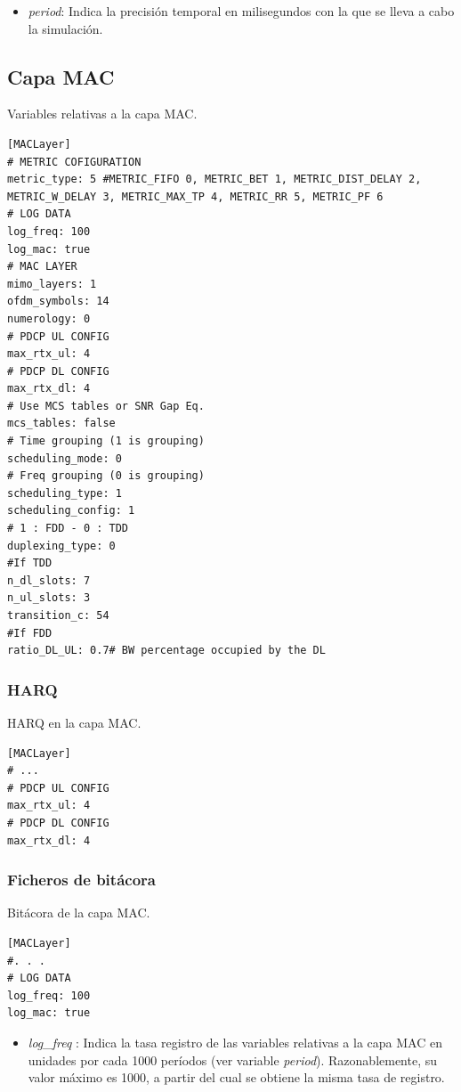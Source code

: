 \documentclass[12pt]{report} %
\begin{document}
\begin{itemize}
\item \textit{period}: Indica la precisión temporal en milisegundos con la que se lleva a cabo la simulación.
\end{itemize}

\subsection* {Capa MAC}

Variables relativas a la capa MAC.

\begin{lstlisting}
[MACLayer]
# METRIC COFIGURATION
metric_type: 5 #METRIC_FIFO 0, METRIC_BET 1, METRIC_DIST_DELAY 2, METRIC_W_DELAY 3, METRIC_MAX_TP 4, METRIC_RR 5, METRIC_PF 6
# LOG DATA
log_freq: 100
log_mac: true
# MAC LAYER
mimo_layers: 1
ofdm_symbols: 14
numerology: 0
# PDCP UL CONFIG
max_rtx_ul: 4
# PDCP DL CONFIG
max_rtx_dl: 4
# Use MCS tables or SNR Gap Eq.
mcs_tables: false
# Time grouping (1 is grouping)
scheduling_mode: 0
# Freq grouping (0 is grouping)
scheduling_type: 1
scheduling_config: 1
# 1 : FDD - 0 : TDD
duplexing_type: 0
#If TDD
n_dl_slots: 7
n_ul_slots: 3
transition_c: 54
#If FDD
ratio_DL_UL: 0.7# BW percentage occupied by the DL
\end{lstlisting}

\subsubsection* {HARQ}

HARQ en la capa MAC.

\begin{lstlisting}
[MACLayer]
# ...
# PDCP UL CONFIG
max_rtx_ul: 4
# PDCP DL CONFIG
max_rtx_dl: 4
\end{lstlisting}

\subsubsection* {Ficheros de bitácora}

Bitácora de la capa MAC.

\begin{lstlisting}
[MACLayer]
#. . .
# LOG DATA
log_freq: 100
log_mac: true
\end{lstlisting}

\begin{itemize}
\item \textit{log\_freq} : Indica la tasa registro de las variables relativas a la capa MAC en unidades por cada 1000 períodos (ver variable \textit{period}). Razonablemente, su valor máximo es 1000, a partir del cual se obtiene la misma tasa de registro.
\end{itemize}
\end{document}

